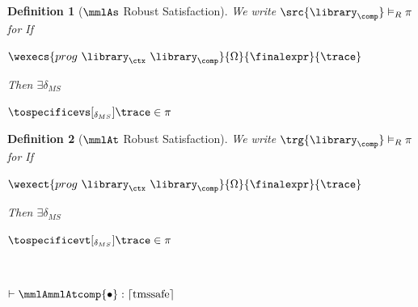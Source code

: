 \documentclass[a4paper,names,dvipsnames]{article}
\newtheorem{definition}{Definition}
\begin{document}
\begin{definition}[$\mmlAs$ Robust Satisfaction]
  We write $\src{\library_{\comp}}\vDash_{R}\pi$ for
  If
  \begin{assumptions}
    \item $\wexecs{prog\ \library_{\ctx}\ \library_{\comp}}{\Omega}{\finalexpr}{\trace}$
  \end{assumptions}
  Then $\exists \delta_{MS}$
  \begin{goals}
    \item $\tospecificevs[_{\delta_{MS}}]{\trace}\in\pi$
  \end{goals}
\end{definition}

\begin{definition}[$\mmlAt$ Robust Satisfaction]
  We write $\trg{\library_{\comp}}\vDash_{R}\pi$ for
  If
  \begin{assumptions}
    \item $\wexect{prog\ \library_{\ctx}\ \library_{\comp}}{\Omega}{\finalexpr}{\trace}$
  \end{assumptions}
  Then $\exists \delta_{MS}$
  \begin{goals}
    \item $\tospecificevt[_{\delta_{MS}}]{\trace}\in\pi$
  \end{goals}
\end{definition}

\begin{scontents}[store-env=buffer]
  $\;$\\
  \begin{goals}
    \item $\vdash\mmlAmmlAtcomp{\bullet}:\lceil\operatorname{tmssafe}\rceil$
  \end{goals}
\end{scontents}
\end{document}
